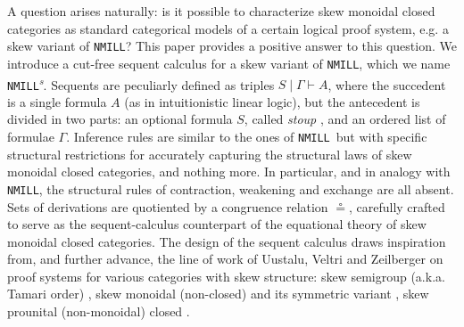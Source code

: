 \documentclass[copyright,creativecommons]{eptcs}
\theoremstyle{definition}
\newcommand{\NMILL}{\texttt{NMILL}}
\newcommand{\SkNMILL}{\NMILL\textsuperscript{\textit{s}}}
\begin{document}
A question arises naturally: is it possible to characterize skew monoidal closed categories as standard categorical models of a certain logical proof system, e.g. a skew variant of \NMILL?
This paper provides a positive answer to this question. We introduce a cut-free sequent calculus for a skew variant of \NMILL, which we name \SkNMILL. Sequents are peculiarly defined as triples $S \mid \Gamma \vdash A$, where the succedent is a single formula $A$ (as in intuitionistic linear logic), but the antecedent is divided in two parts: an optional formula $S$, called \emph{stoup} \cite{girard:constructive:91}, and an ordered list of formulae $\Gamma$. Inference rules are similar to the ones of \NMILL\ but with specific structural restrictions for accurately capturing the structural laws of skew monoidal closed categories, and nothing more. In particular, and in analogy with \NMILL, the structural rules of contraction, weakening and exchange are all absent. Sets of derivations are quotiented by a congruence relation $\circeq$, carefully crafted to serve as the sequent-calculus counterpart of the equational theory of skew monoidal closed categories. The design of the sequent calculus draws inspiration from, and further advance, the line of work of Uustalu, Veltri and Zeilberger on proof systems for various categories with skew structure: skew semigroup (a.k.a. Tamari order) \cite{zeilberger:semiassociative:19}, skew monoidal (non-closed) \cite{uustalu:sequent:2021,uustalu:proof:nodate} and its symmetric variant \cite{veltri:coherence:2021}, skew prounital (non-monoidal) closed \cite{uustalu:deductive:nodate}.
\end{document}
